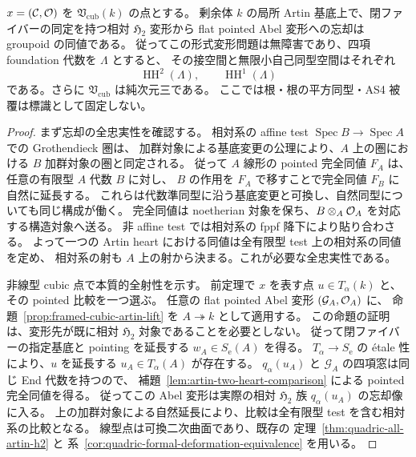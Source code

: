 \begin{corollary}
\label{cor:cubic-formal-h2-abelian}
$x=(\mathcal C,\mathcal O)$ を $\mathfrak V_{\mathrm{cub}}(k)$ の点とする。
剰余体 $k$ の局所 Artin 基底上で、閉ファイバーの同定を持つ相対 $\mathfrak H_2$ 変形から
flat pointed Abel 変形への忘却は groupoid の同値である。
従ってこの形式変形問題は無障害であり、四項 foundation 代数を $\Lambda$ とすると、
その接空間と無限小自己同型空間はそれぞれ
\[
 \operatorname{HH}^2(\Lambda),\qquad\operatorname{HH}^1(\Lambda)
\]
である。さらに $\mathfrak V_{\mathrm{cub}}$ は純次元三である。
ここでは根・根の平方同型・AS4 被覆は標識として固定しない。
\end{corollary}

\begin{proof}
まず忘却の全忠実性を確認する。
相対系の affine test $\operatorname{Spec} B\to\operatorname{Spec} A$ での Grothendieck 圏は、
加群対象による基底変更の公理により、$A$ 上の圏における $B$ 加群対象の圏と同定される。
従って $A$ 線形の pointed 完全同値 $F_A$ は、任意の有限型 $A$ 代数 $B$ に対し、
$B$ の作用を $F_A$ で移すことで完全同値 $F_B$ に自然に延長する。
これらは代数準同型に沿う基底変更と可換し、自然同型についても同じ構成が働く。
完全同値は noetherian 対象を保ち、$B\otimes_A\mathcal O_A$ を対応する構造対象へ送る。
非 affine test では相対系の fppf 降下により貼り合わさる。
よって一つの Artin heart における同値は全有限型 test 上の相対系の同値を定め、
相対系の射も $A$ 上の射から決まる。これが必要な全忠実性である。

非線型 cubic 点で本質的全射性を示す。
前定理で $x$ を表す点 $u\in T_\alpha(k)$ と、その pointed 比較を一つ選ぶ。
任意の flat pointed Abel 変形 $(\mathcal G_A,\mathcal O_A)$ に、
命題~\ref{prop:framed-cubic-artin-lift} を $A\twoheadrightarrow k$ として適用する。
この命題の証明は、変形先が既に相対 $\mathfrak H_2$ 対象であることを必要としない。
従って閉ファイバーの指定基底と pointing を延長する $w_A\in S_{\mathrm e}(A)$ を得る。
$T_\alpha\to S_{\mathrm e}$ の étale 性により、$u$ を延長する $u_A\in T_\alpha(A)$ が存在する。
$q_\alpha(u_A)$ と $\mathcal G_A$ の四項窓は同じ End 代数を持つので、
補題~\ref{lem:artin-two-heart-comparison} による pointed 完全同値を得る。
従ってこの Abel 変形は実際の相対 $\mathfrak H_2$ 族 $q_\alpha(u_A)$ の忘却像に入る。
上の加群対象による自然延長により、比較は全有限型 test を含む相対系の比較となる。
線型点は可換二次曲面であり、既存の
定理~\ref{thm:quadric-all-artin-h2} と
系~\ref{cor:quadric-formal-deformation-equivalence} を用いる。


\end{proof}

